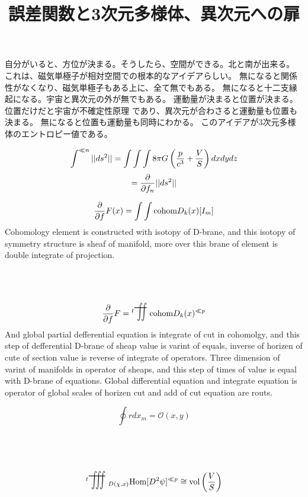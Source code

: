\documentclass{jsarticle}
\begin{document}
\title{誤差関数と3次元多様体、異次元への扉}
\author{}
\date{}
\maketitle

    自分がいると、方位が決まる。そうしたら、空間ができる。北と南が出来る。
    これは、磁気単極子が相対空間での根本的なアイデアらしい。
    無になると関係性がなくなり、磁気単極子もある上に、全て無でもある。
    無になると十二支縁起になる。宇宙と異次元の外が無でもある。
    運動量が決まると位置が決まる。位置だけだと宇宙が不確定性原理
    であり、異次元が合わさると運動量も位置も決まる。
    無になると位置も運動量も同時にわかる。
    このアイデアが3次元多様体のエントロピー値である。
    
    $$ \int^{\ll n} ||ds^2|| = \int\int\int 8 \pi G \left({p \over c^3} + 
    {V \over S}\right)dxdydz $$
    $$ = {\partial \over \partial f_n}{||ds^2||} $$
    \newcommand{\variint}{%
	\begin{picture}(15,30)
		\put(0,0){
			$ \iint $}
		\put(0,5){\line(15,0){15}}
	\end{picture} %
}

\newcommand{\variiint}{%
	\begin{picture}(20,30)
		\put(0,0){
			$ \iiint $}
		\put(0,5){\line(15,0){20}}
	\end{picture} %
}



 $$ {\partial \over \partial f}F(x) = \int \int \text{cohom}D_k(x)[I_m]  $$
 Cohomology element is constructed with isotopy of D-brane,
 and this isotopy of symmetry structure is sheaf of manifold,
 more over this brane of element is double integrate of projection.
 $$ {\partial \over \partial f}F = {{}^t \scalebox{1}[2]{\variint}}
 \text{cohom}D_k(x)^{\ll p} $$
 And global partial defferential equation is integrate of cut in cohomolgy,
 and this step of defferential D-brane of sheap value is varint of equals,
 inverse of horizen of cute of section value is reverse of integrate of 
 operators. Three dimension of varint of manifolds in operator of sheaps,
 and this step of times of value is equal with D-brane of equations.
 Global differential equation and integrate equation is operator of 
 global scales of horizen cut and add of cut equation are routs.

 $$ \oint r dx_m = \mathcal{O}(x,y) $$

 $$ {{}^t \scalebox{1}[2]{\variiint}}_{{D(\chi,x)}} 
 \text{Hom}[D^2 \psi]^{\ll p} \cong 
 \text{vol}\left({V \over S}\right) $$
\end{document}
